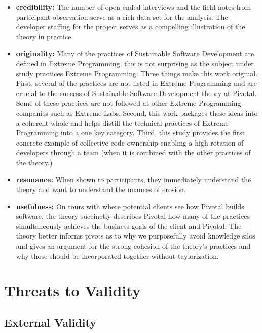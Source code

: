 \begin{table}[]
\begin{itemize}
\item 
\textbf{credibility:}  The number of open ended interviews and the field notes from participant observation serve as a rich data set for the analysis. The developer staffing for the project serves as a compelling illustration of the theory in practice

\item
\textbf{originality:} Many of the practices of Sustainable Software Development are defined in Extreme Programming, this is not surprising as the subject under study practices Extreme Programming. Three things make this work original. First, several of the practices are not listed in Extreme Programming and are crucial to the success of Sustainable Software Development theory at Pivotal. Some of these practices are not followed at other Extreme Programming companies such as Extreme Labs. Second, this work packages these ideas into a coherent whole and helps distill the technical practices of Extreme Programming into a one key category. Third, this study provides the first concrete example of collective code ownership enabling a high rotation of developers through a team (when it is combined with the other practices of the theory.)

\item
\textbf{resonance:} When shown to participants, they immediately understand the theory and want to understand the nuances of erosion.

\item
\textbf{usefulness:} 
On tours with where potential clients see how Pivotal builds software, the theory succinctly describes Pivotal how many of the practices simultaneously achieves the business goals of the client and Pivotal. The theory better informs pivots as to why we purposefully avoid knowledge silos and gives an argument for the strong cohesion of the theory's practices and why those should be incorporated together without taylorization. 
\end{itemize}

\section{Threats to Validity}

\subsection{External Validity}


\end{table}
